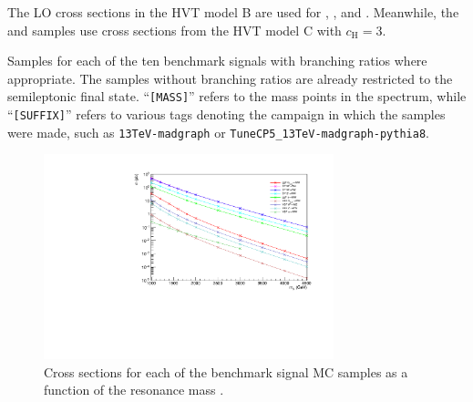 The LO cross sections in the HVT model B are used for \DY\ZprtoWW, \DY\WprtoWZ, and \DY\WprtoWH.
Meanwhile, the \VBF\ZprtoWW and \DY\WprtoWZ samples use cross sections from the HVT model C with $c_\mathrm{H}=3$.%

\begin{table}[htbp]
  \centering
  
  \caption{
    Samples for each of the ten benchmark signals with branching ratios where appropriate.
    The samples without branching ratios are already restricted to the semileptonic final state.
    ``\texttt{[MASS]}'' refers to the mass points in the \MVV spectrum, while ``\texttt{[SUFFIX]}'' refers to various tags denoting the campaign in which the samples were made, such as \texttt{13TeV-madgraph} or \texttt{TuneCP5\_13TeV-madgraph-pythia8}.
  }
  \label{tab:sigSamples}
\end{table}

\begin{figure}[htbp]
  \centering
  \includegraphics[width=0.75\textwidth]{fig/samples/sigCrossSec.pdf}
  \caption{
    Cross sections for each of the benchmark signal MC samples as a function of the resonance mass \MX.
  }
  \label{fig:sigCrossSec}
\end{figure}


